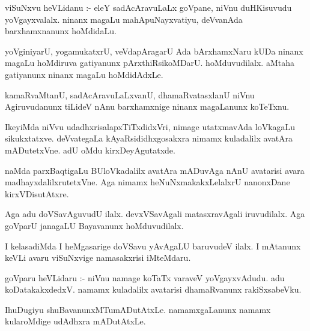 \documentclass{article}
\begin{document}
\begin{mn}
viSuNxvu  heVLidanu :- eleY  sadAcAravuLaLx  goVpane,  niVnu  duHKisuvudu  yoVgayxvalalx.  
ninanx  magaLu  mahApuNayxvatiyu,  deVvanAda barxhamxnanunx  hoMdidaLu.
\end{mn}

\begin{mn}
yoVginiyarU,  yogamukatxrU,  veVdapAragarU  Ada bArxhamxNaru kUDa  ninanx magaLu  
hoMdiruva gatiyanunx  pArxthiRsikoMDarU.  hoMduvudilalx.  aMtaha  gatiyanunx  ninanx magaLu hoMdidAdxLe.
\end{mn}

\begin{mn}
kamaRvaMtanU, sadAcAravuLaLxvanU,  dhamaRvatasxlanU  niVnu  Agiruvudanunx  tiLideV  nAnu  
barxhamxnige  ninanx magaLanunx koTeTxnu.
\end{mn}

\begin{mn}
IkeyiMda  niVvu  udadhxrisalapxTiTxdidxVri,  nimage  utatxmavAda loVkagaLu  sikukxtatxve.  
deVvategaLa  kAyaRsididhxgosakxra  nimamx  kuladalilx avatAra  mADutetxVne.  adU oMdu kirxDeyAgutatxde.
\end{mn}

\begin{mn}
naMda parxBaqtigaLu BUloVkadalilx avatAra  mADuvAga nAnU  avatarisi avara  madhayxdalilxrutetxVne.  
Aga nimamx  heNuNxmakakxLelalxrU  nanonxDane  kirxVDisutAtxre.
\end{mn}

\begin{mn}
Aga  adu doVSavAguvudU ilalx.  devxVSavAgali  matasxravAgali iruvudilalx.  
Aga  goVparU  janagaLU  Bayavanunx  hoMduvudilalx.
\end{mn}

\begin{mn}
I kelasadiMda I  heMgasarige  doVSavu  yAvAgaLU baruvudeV ilalx.  I mAtanunx  
keVLi avaru viSuNxvige  namasakxrisi  iMteMdaru.
\end{mn}

\begin{mn}
goVparu heVLidaru :- niVnu namage koTaTx varaveV  yoVgayxvAdudu.   adu  koDatakakxdedxV.  
namamx  kuladalilx  avatarisi  dhamaRvanunx  rakiSxsabeVku.
\end{mn}

\begin{mn}
IhuDugiyu  shuBavanunxMTumADutAtxLe.  namamxgaLanunx namamx kularoMdige udAdhxra mADutAtxLe.
\end{mn}
\end{document}
